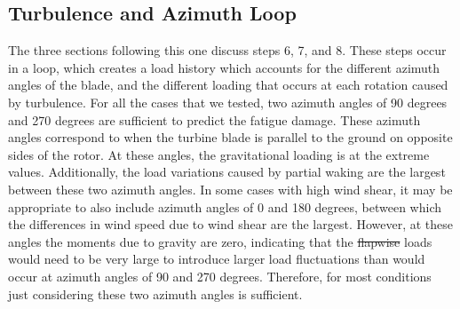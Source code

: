 \documentclass[11pt,letterpaper]{article}
\providecommand{\DIFadd}[1]{{\protect\color{blue}\uwave{#1}}} %
\providecommand{\DIFdel}[1]{{\protect\color{red}\sout{#1}}}                      %
\providecommand{\DIFaddbegin}{} %
\providecommand{\DIFaddend}{} %
\providecommand{\DIFdelbegin}{} %
\providecommand{\DIFdelend}{} %
\newcommand{\DIFscaledelfig}{0.5}
\newlength{\DIFdelgraphicswidth} %
\newlength{\DIFdelgraphicsheight} %
\newcommand{\DIFaddincludegraphics}[2][]{{\color{blue}\fbox{\DIFOincludegraphics[#1]{#2}}}} %
\newcommand{\DIFdelincludegraphics}[2][]{%
\sbox{\DIFdelgraphicsbox}{\DIFOincludegraphics[#1]{#2}}%
\settoboxwidth{\DIFdelgraphicswidth}{\DIFdelgraphicsbox} %
\settoboxtotalheight{\DIFdelgraphicsheight}{\DIFdelgraphicsbox} %
\scalebox{\DIFscaledelfig}{%
\parbox[b]{\DIFdelgraphicswidth}{\usebox{\DIFdelgraphicsbox}\\[-\baselineskip] \rule{\DIFdelgraphicswidth}{0em}}\llap{\resizebox{\DIFdelgraphicswidth}{\DIFdelgraphicsheight}{%
\setlength{\unitlength}{\DIFdelgraphicswidth}%
\begin{picture}(1,1)%
\thicklines\linethickness{2pt} %
{\color[rgb]{1,0,0}\put(0,0){\framebox(1,1){}}}%
{\color[rgb]{1,0,0}\put(0,0){\line( 1,1){1}}}%
{\color[rgb]{1,0,0}\put(0,1){\line(1,-1){1}}}%
\end{picture}%
}\hspace*{3pt}}} %
} %
\DeclareRobustCommand{\DIFaddbegin}{\DIFOaddbegin \let\includegraphics\DIFaddincludegraphics} %
\DeclareRobustCommand{\DIFaddend}{\DIFOaddend \let\includegraphics\DIFOincludegraphics} %
\DeclareRobustCommand{\DIFdelbegin}{\DIFOdelbegin \let\includegraphics\DIFdelincludegraphics} %
\DeclareRobustCommand{\DIFdelend}{\DIFOaddend \let\includegraphics\DIFOincludegraphics} %
\begin{document}
\DIFdelbegin %
\DIFdelend %

\DIFaddbegin 

\subsection{Turbulence and Azimuth Loop}
\label{sec:loop}
\DIFaddend The three sections following this one discuss steps 6, 7, and 8. These steps occur in a loop, which creates a load history which accounts for the different azimuth angles of the blade, and the different loading that occurs at each rotation caused by turbulence. 
For all the cases that we tested, two azimuth angles of 90 degrees and 270 degrees are sufficient to predict the fatigue damage. These azimuth angles correspond to when the turbine blade is parallel to the ground on opposite sides of the rotor. At these angles, the gravitational loading is at the extreme values. Additionally, the load variations caused by partial waking are the largest between these two azimuth angles. In some cases with high wind shear, it may be appropriate to also include azimuth angles of 0 and 180 degrees, between which the differences in wind speed due to wind shear are the largest. However, at these angles the moments due to gravity are zero, indicating that the \DIFdelbegin \DIFdel{flapwise }\DIFdelend \DIFaddbegin \DIFadd{flatwise }\DIFaddend loads would need to be very large to introduce larger load fluctuations than would occur at azimuth angles of 90 and 270 degrees. Therefore, for most conditions just considering these two azimuth angles is sufficient. %
\end{document}
